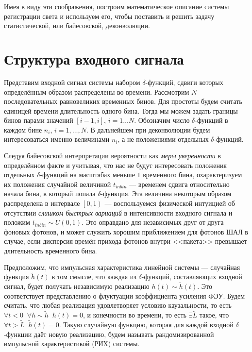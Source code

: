 Имея в виду эти соображения, построим математическое описание системы регистрации света и используем его, чтобы поставить и решить задачу статистической, или байесовской, деконволюции.

\section{Структура входного сигнала}

Представим входной сигнал системы набором $\delta$-функций, сдвиги которых определённым образом распределены во времени. Рассмотрим $N$ последовательных равновеликих временных бинов. Для простоты будем считать единицей времени длительность одного бина. Тогда мы можем задать границы бинов парами значений $[i-1, i]$, $i = 1 \ldots N$. Обозначим число $\delta$-функций в каждом бине $n_i$, $i = 1, \ldots, N$. В дальнейшем при деконволюции будем интересоваться именно величинами $n_i$, а не положениями отдельных $\delta$-функций.

Следуя байесовской интерпретации вероятности как \textit{меры уверенности} в определённом факте и учитывая, что нас не будут интересовать положения отдельных $\delta$-функций на масштабах меньше $1$ временного бина, охарактеризуем их положения случайной величиной $t_{inbin}$ --- временем сдвига относительно начала бина, в который попала $\delta$-функция. Эта величина некоторым образом распределена в интервале $\left[0, 1\right)$ --- воспользуемся физической интуицией об отсутствии \textit{слишком быстрых вариаций} в интенсивности входного сигнала и положим $t_{inbin} \sim U(0, 1)$. Это оправдано для независимых друг от друга фоновых фотонов, и может служить хорошим приближением для фотонов ШАЛ в случае, если дисперсия времён прихода фотонов внутри <<пакета>> превышает длительность временного бина.

Предположим, что импульсная характеристика линейной системы --- случайная функция $\tilde{h}(t)$ в том смысле, что каждая из $\delta$-функций, составляющих входной сигнал, будет получать независимую реализацию $h(t) \sim \tilde{h}(t)$. Это соответствует представлению о флуктуации коэффициента усиления ФЭУ. Будем считать, что любая реализация удовлетворяет условию каузальности, то есть $\forall t < 0 \; \; \forall h \sim \tilde{h} \; \; h(t) = 0$, и конечности во времени, то есть $\exists \tilde{L}$ такое, что $\forall t > \tilde{L} \; \; \tilde{h}(t) = 0$. Такую случайную функцию, которая для каждой входной $\delta$-функции даёт новую реализацию, будем называть рандомизированной импульсной характеристикой (РИХ) системы.

